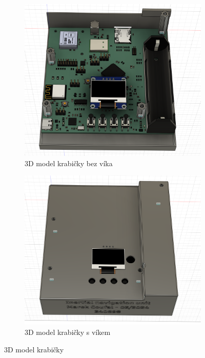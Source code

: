 \begin{figure}
     \centering
     \begin{subfigure}[b]{0.45\textwidth}
         \centering
         \includegraphics[width=\textwidth]{obrazky/boxNoLid}
         \caption{3D model krabičky bez víka}
       
     \end{subfigure}
     \hfill
     \begin{subfigure}[b]{0.45\textwidth}
         \centering
         \includegraphics[width=\textwidth]{obrazky/boxWithLid}
         \caption{3D model krabičky s víkem}
         
     \end{subfigure}
        \caption{3D model krabičky}
        \label{fig:boxModel}
\end{figure}

